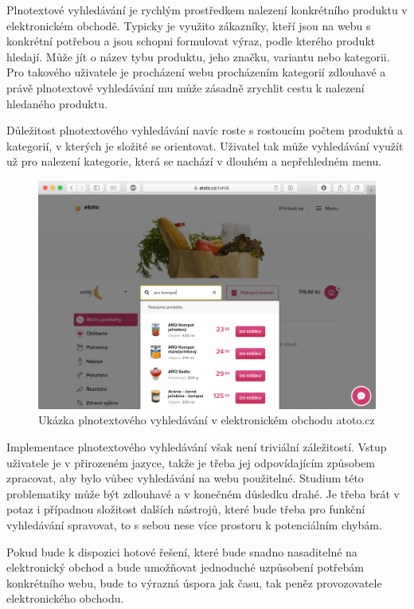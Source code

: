 \documentclass[FM,DP]{tulthesis}
\begin{document}
Plnotextové vyhledávání je rychlým prostředkem nalezení konkrétního produktu
v elektronickém obchodě. Typicky je využito zákazníky, kteří jsou na webu
s konkrétní potřebou a jsou schopni formulovat výraz, podle kterého produkt
hledají. Může jít o název tybu produktu, jeho značku, variantu nebo kategorii.
Pro takového uživatele je procházení webu procházením kategorií zdlouhavé
a právě plnotextové vyhledávání mu může zásadně zrychlit cestu k nalezení 
hledaného produktu.

Důležitost plnotextového vyhledávání navíc roste s rostoucím počtem produktů a kategorií, 
v kterých je složité se orientovat. Uživatel tak může vyhledávání využít už pro 
nalezení kategorie, která se nachází v dlouhém a nepřehledném menu.

\begin{figure}[h]
\center
\includegraphics[width=\textwidth]{atoto-vyhledavani.png}
\caption[Ukázka plnotextového vyhledávání]{Ukázka plnotextového vyhledávání v elektronickém obchodu atoto.cz}
\label{atoto-vyhledavani}
\end{figure}

Implementace plnotextového vyhledávání však není triviální záležitostí. Vstup uživatele
je v přirozeném jazyce, takže je třeba jej odpovídajícím způsobem zpracovat, 
aby bylo vůbec vyhledávání na webu použitelné. Studium této problematiky
může být zdlouhavé a v konečném důsledku drahé. Je třeba brát v potaz
i případnou složitost dalších nástrojů, které bude třeba pro funkční vyhledávání spravovat, 
to s sebou nese více prostoru k potenciálním chybám.

Pokud bude k dispozici hotové řešení, které bude snadno nasaditelné na elektronický obchod 
a bude umožňovat jednoduché uzpůsobení potřebám konkrétního webu, bude to výrazná úspora jak 
času, tak peněz provozovatele elektronického obchodu.
\end{document}

